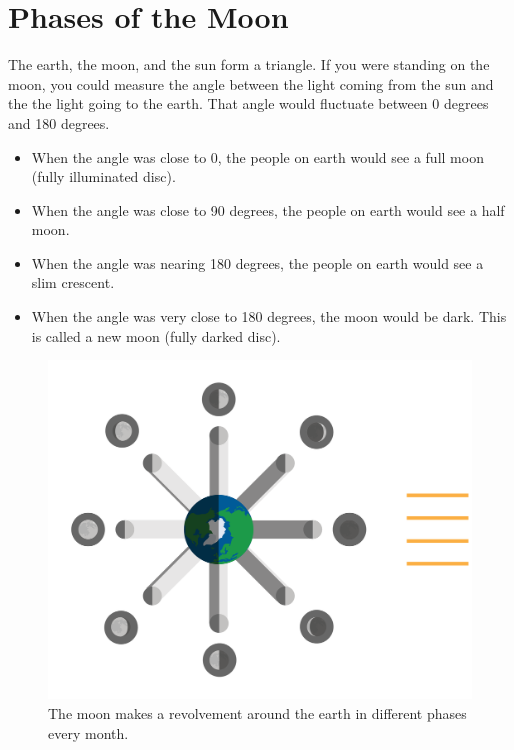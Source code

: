\section{Phases of the Moon}
The earth, the moon, and the sun form a triangle. If you were standing on the moon, you could measure the angle between the light coming from the sun and the the light going to the earth. That angle would fluctuate between 0 degrees and 180 degrees.  
\begin{itemize}
\item When the angle was close to 0,  the people on earth would see a full moon (fully illuminated disc).  
\item When the angle was close to 90 degrees,  the people on earth would see a half moon. 
\item When the angle was nearing 180 degrees, the people on earth would see a slim crescent.
\item When the angle was very close to 180 degrees,  the moon would be dark.  This is called a new moon (fully darked disc).
\end{itemize}

\begin{figure}[htbp]
    \centering
    \includegraphics[width=.7\textwidth]{moonPhase.png}
    \caption{The moon makes a revolvement around the earth in different phases every month.}
    \label{fig:moonPhase}
\end{figure}


